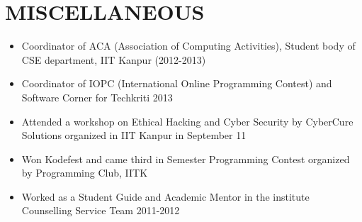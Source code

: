 \documentclass{article}
\begin{document}

\section*{MISCELLANEOUS}
\begin{itemize}
\item Coordinator of ACA (Association of Computing Activities), Student body of CSE department, IIT Kanpur (2012-2013)
\item Coordinator of IOPC (International Online Programming Contest) and Software Corner for Techkriti 2013
\item Attended a workshop on Ethical Hacking and Cyber Security by CyberCure Solutions organized in IIT Kanpur in September 11
\item Won Kodefest and came third in Semester Programming Contest organized by Programming Club, IITK
\item Worked as a Student Guide and Academic Mentor in the institute Counselling Service Team 2011-2012
\end{itemize}
\end{document}
